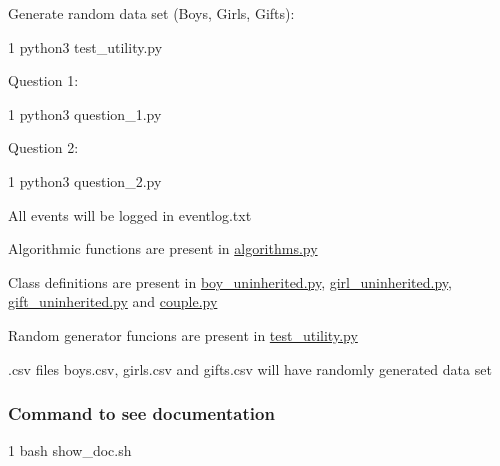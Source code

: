 \begin{DoxyItemize}
\item Generate random data set (Boys, Girls, Gifts)\+: 
\begin{DoxyCode}
1 python3 test\_utility.py
\end{DoxyCode}

\item Question 1\+: 
\begin{DoxyCode}
1 python3 question\_1.py
\end{DoxyCode}

\item Question 2\+: 
\begin{DoxyCode}
1 python3 question\_2.py
\end{DoxyCode}

\item All events will be logged in {\ttfamily eventlog.\+txt}
\item Algorithmic functions are present in {\ttfamily \hyperlink{algorithms_8py}{algorithms.\+py}}
\item Class definitions are present in {\ttfamily \hyperlink{boy__uninherited_8py}{boy\+\_\+uninherited.\+py}}, {\ttfamily \hyperlink{girl__uninherited_8py}{girl\+\_\+uninherited.\+py}}, {\ttfamily \hyperlink{gift__uninherited_8py}{gift\+\_\+uninherited.\+py}} and {\ttfamily \hyperlink{couple_8py}{couple.\+py}}
\item Random generator funcions are present in {\ttfamily \hyperlink{test__utility_8py}{test\+\_\+utility.\+py}}
\item .csv files {\ttfamily boys.\+csv}, {\ttfamily girls.\+csv} and {\ttfamily gifts.\+csv} will have randomly generated data set
\end{DoxyItemize}

\subsubsection*{Command to see documentation}


\begin{DoxyCode}
1 bash show\_doc.sh
\end{DoxyCode}
 